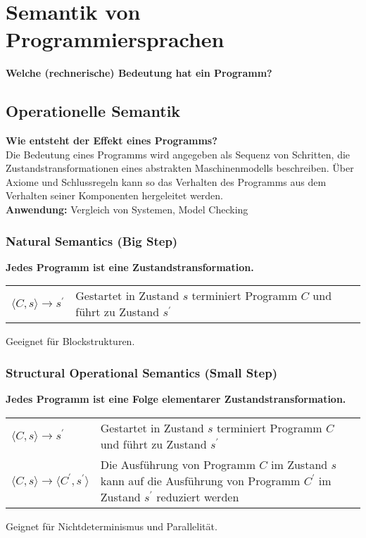 \documentclass{scrreprt}
\theoremstyle{definition}
\theoremstyle{example}
\theoremstyle{algorithm}
\begin{document}
\chapter{Semantik von Programmiersprachen}
{\Large\textbf{\textsf{Welche (rechnerische) Bedeutung hat ein Programm?}}}

\section{Operationelle Semantik}
\textbf{\textsf{Wie entsteht der Effekt eines Programms?}}\\
Die Bedeutung eines Programms wird angegeben als Sequenz von Schritten, die Zustandstransformationen eines abstrakten Maschinenmodells beschreiben. Über Axiome und Schlussregeln kann so das Verhalten des Programms aus dem Verhalten seiner Komponenten hergeleitet werden.\\
\textbf{Anwendung:} Vergleich von Systemen, Model Checking

\subsection{Natural Semantics (Big Step)}
\textbf{\textsf{Jedes Programm ist eine Zustandstransformation.}}\\
\begin{tabularx}{\linewidth}{lX}
$\langle C,s\rangle\rightarrow s^\prime$&Gestartet in Zustand $s$ terminiert Programm $C$ und führt zu Zustand $s^\prime$\\
\end{tabularx}
Geeignet für Blockstrukturen.

\subsection{Structural Operational Semantics (Small Step)}
\textbf{\textsf{Jedes Programm ist eine Folge elementarer Zustandstransformation.}}\\
\begin{tabularx}{\linewidth}{lX}
$\langle C,s\rangle\rightarrow s^\prime$&Gestartet in Zustand $s$ terminiert Programm $C$ und führt zu Zustand $s^\prime$\\
$\langle C,s\rangle\rightarrow \langle C^\prime,s^\prime\rangle$&Die Ausführung von Programm $C$ im Zustand $s$ kann auf die Ausführung von Programm $C^\prime$ im Zustand $s^\prime$ reduziert werden\\
\end{tabularx}
Geignet für Nichtdeterminismus und Parallelität.
\end{document}
